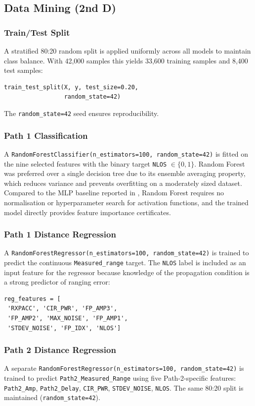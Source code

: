 \documentclass[conference]{IEEEtran}
\begin{document}
\subsection{Data Mining (2nd D)}

\subsubsection{Train/Test Split}
A stratified 80:20 random split is applied uniformly across all models to maintain
class balance. With 42{,}000 samples this yields 33{,}600 training samples and
8{,}400 test samples:
\begin{verbatim}
train_test_split(X, y, test_size=0.20,
                 random_state=42)
\end{verbatim}
The \texttt{random\_state=42} seed ensures reproducibility.

\subsubsection{Path 1 Classification}
A \texttt{RandomForestClassifier(n\_estimators=100, random\_state=42)} is fitted on the
nine selected features with the binary target \texttt{NLOS} $\in \{0, 1\}$. Random
Forest was preferred over a single decision tree due to its ensemble averaging property,
which reduces variance and prevents overfitting on a moderately sized dataset. Compared
to the MLP baseline reported in \cite{bregar2018improving}, Random Forest requires no
normalisation or hyperparameter search for activation functions, and the trained model
directly provides feature importance certificates.

\subsubsection{Path 1 Distance Regression}
A \texttt{RandomForestRegressor(n\_estimators=100, random\_state=42)} is trained to
predict the continuous \texttt{Measured\_range} target. The \texttt{NLOS} label is
included as an input feature for the regressor because knowledge of the propagation
condition is a strong predictor of ranging error:
\begin{verbatim}
reg_features = [
 'RXPACC', 'CIR_PWR', 'FP_AMP3',
 'FP_AMP2', 'MAX_NOISE', 'FP_AMP1',
 'STDEV_NOISE', 'FP_IDX', 'NLOS']
\end{verbatim}

\subsubsection{Path 2 Distance Regression}
A separate \texttt{RandomForestRegressor(n\_estimators=100, random\_state=42)} is
trained to predict \texttt{Path2\_Measured\_Range} using five Path-2-specific features:
\texttt{Path2\_Amp}, \texttt{Path2\_Delay}, \texttt{CIR\_PWR}, \texttt{STDEV\_NOISE},
\texttt{NLOS}. The same 80:20 split is maintained (\texttt{random\_state=42}).
\end{document}
